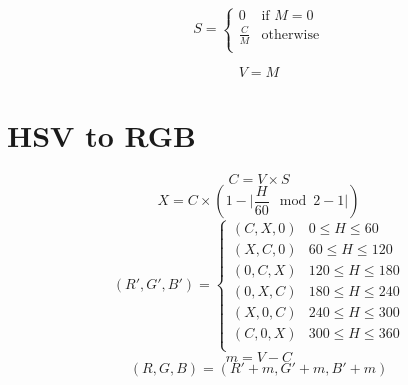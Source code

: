 \documentclass[12pt]{book}
\begin{document}
$$
S =
\begin{cases}
0 & \text{if $M = 0$}\\
\frac{C}{M}& \text{otherwise} \\
\end{cases}
$$

$$V = M$$

\section{HSV to RGB}

$$C = V \times S$$
$$X = C \times (1 - \lvert \frac{H}{60} \mod 2 - 1\rvert )$$
$$
(R', G', B') = 
\begin{cases}
(C, X, 0) & 0 \leq H \leq 60 \\
(X, C, 0) & 60 \leq H \leq 120 \\
(0, C, X) & 120 \leq H \leq 180 \\
(0, X, C) & 180 \leq H \leq 240 \\
(X, 0, C) & 240 \leq H \leq 300 \\
(C, 0, X) & 300 \leq H \leq 360 \\
\end{cases}
$$
$$m = V - C$$
$$ (R, G, B) = (R' + m, G' + m, B' + m)$$


\printbibliography
\end{document}
